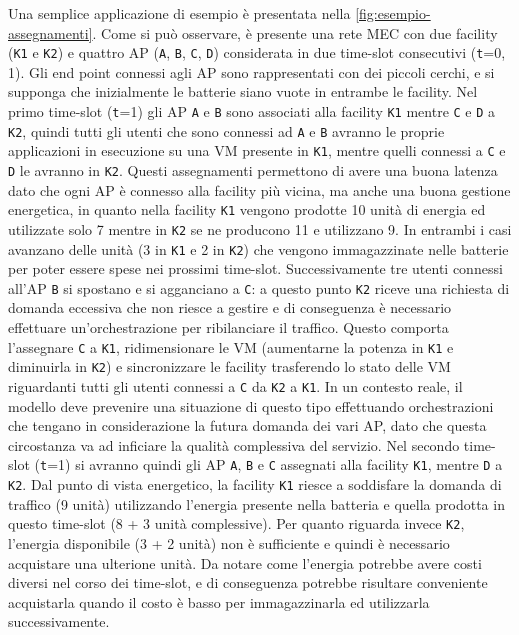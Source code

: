 Una semplice applicazione di esempio è presentata nella \autoref{fig:esempio-assegnamenti}. Come si può osservare, è presente una rete MEC con due facility (\texttt{K1} e \texttt{K2}) e quattro AP (\texttt{A}, \texttt{B}, \texttt{C}, \texttt{D}) considerata in due time-slot consecutivi (\texttt{t}=0, 1). Gli end point connessi agli AP sono rappresentati con dei piccoli cerchi, e si supponga che inizialmente le batterie siano vuote in entrambe le facility. Nel primo time-slot (\texttt{t}=1) gli AP \texttt{A} e \texttt{B} sono associati alla facility \texttt{K1} mentre \texttt{C} e \texttt{D} a \texttt{K2}, quindi tutti gli utenti che sono connessi ad \texttt{A} e \texttt{B} avranno le proprie applicazioni in esecuzione su una VM presente in \texttt{K1}, mentre quelli connessi a \texttt{C} e \texttt{D} le avranno in \texttt{K2}. Questi assegnamenti permettono di avere una buona latenza dato che ogni AP è connesso alla facility più vicina, ma anche una buona gestione energetica, in quanto nella facility \texttt{K1} vengono prodotte 10 unità di energia ed utilizzate solo 7 mentre in \texttt{K2} se ne producono 11 e utilizzano 9. In entrambi i casi avanzano delle unità (3 in \texttt{K1} e 2 in \texttt{K2}) che vengono immagazzinate nelle batterie per poter essere spese nei prossimi time-slot. Successivamente tre utenti connessi all'AP \texttt{B} si spostano e si agganciano a \texttt{C}: a questo punto \texttt{K2} riceve una richiesta di domanda eccessiva che non riesce a gestire e di conseguenza è necessario effettuare un'orchestrazione per ribilanciare il traffico. Questo comporta l'assegnare \texttt{C} a \texttt{K1}, ridimensionare le VM (aumentarne la potenza in \texttt{K1} e diminuirla in \texttt{K2}) e sincronizzare le facility trasferendo lo stato delle VM riguardanti tutti gli utenti connessi a \texttt{C} da \texttt{K2} a \texttt{K1}. In un contesto reale, il modello deve prevenire una situazione di questo tipo effettuando orchestrazioni che tengano in considerazione la futura domanda dei vari AP, dato che questa circostanza va ad inficiare la qualità complessiva del servizio. Nel secondo time-slot (\texttt{t}=1) si avranno quindi gli AP \texttt{A}, \texttt{B} e \texttt{C} assegnati alla facility \texttt{K1}, mentre \texttt{D} a \texttt{K2}. Dal punto di vista energetico, la facility \texttt{K1} riesce a soddisfare la domanda di traffico (9 unità) utilizzando l'energia presente nella batteria e quella prodotta in questo time-slot (8 + 3 unità complessive). Per quanto riguarda invece \texttt{K2}, l'energia disponibile (3 + 2 unità) non è sufficiente e quindi è necessario acquistare una ulterione unità. Da notare come l'energia potrebbe avere costi diversi nel corso dei time-slot, e di conseguenza potrebbe risultare conveniente acquistarla quando il costo è basso per immagazzinarla ed utilizzarla successivamente.


